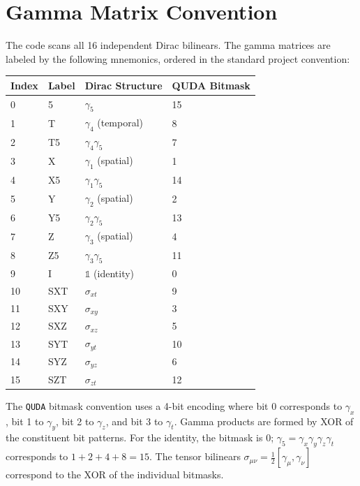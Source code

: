 \documentclass[11pt,a4paper]{article}
\newcommand{\gfive}{\gamma_5}
\newcommand{\quda}{\texttt{QUDA}}
\begin{document}
\section{Gamma Matrix Convention}

The code scans all 16 independent Dirac bilinears.  The gamma matrices are
labeled by the following mnemonics, ordered in the standard project convention:

\begin{center}
\begin{tabular}{llll}
\toprule
\textbf{Index} & \textbf{Label} & \textbf{Dirac Structure} & \textbf{QUDA Bitmask} \\
\midrule
0  & 5    & \(\gfive\)                  & 15 \\
1  & T    & \(\gamma_4\) (temporal)     & 8  \\
2  & T5   & \(\gamma_4 \gfive\)        & 7  \\
3  & X    & \(\gamma_1\) (spatial)     & 1  \\
4  & X5   & \(\gamma_1 \gfive\)        & 14 \\
5  & Y    & \(\gamma_2\) (spatial)     & 2  \\
6  & Y5   & \(\gamma_2 \gfive\)        & 13 \\
7  & Z    & \(\gamma_3\) (spatial)     & 4  \\
8  & Z5   & \(\gamma_3 \gfive\)        & 11 \\
9  & I    & \(\mathbb{1}\) (identity)  & 0  \\
10 & SXT  & \(\sigma_{xt}\)            & 9  \\
11 & SXY  & \(\sigma_{xy}\)            & 3  \\
12 & SXZ  & \(\sigma_{xz}\)            & 5  \\
13 & SYT  & \(\sigma_{yt}\)            & 10 \\
14 & SYZ  & \(\sigma_{yz}\)            & 6  \\
15 & SZT  & \(\sigma_{zt}\)            & 12 \\
\bottomrule
\end{tabular}
\end{center}

The \quda{} bitmask convention uses a 4-bit encoding where bit 0 corresponds to
\(\gamma_x\), bit 1 to \(\gamma_y\), bit 2 to \(\gamma_z\), and bit 3 to
\(\gamma_t\).  Gamma products are formed by XOR of the constituent bit patterns.
For the identity, the bitmask is 0; \(\gfive = \gamma_x \gamma_y \gamma_z
\gamma_t\) corresponds to \(1+2+4+8 = 15\).  The tensor bilinears
\(\sigma_{\mu\nu} = \frac{1}{2}[\gamma_\mu, \gamma_\nu]\) correspond to the XOR
of the individual bitmasks.
\end{document}
